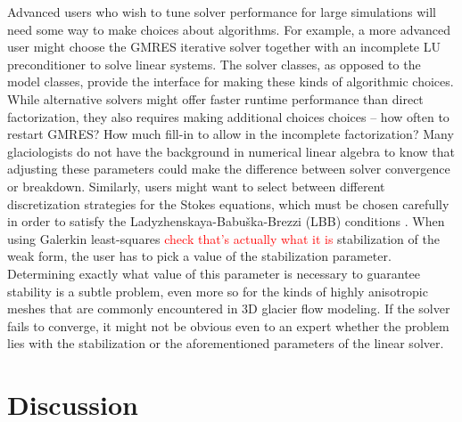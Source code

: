 \documentclass{article}
\theoremstyle{definition}
\theoremstyle{plain}
\begin{document}
Advanced users who wish to tune solver performance for large simulations will need some way to make choices about algorithms.
For example, a more advanced user might choose the GMRES iterative solver together with an incomplete LU preconditioner to solve linear systems.
The solver classes, as opposed to the model classes, provide the interface for making these kinds of algorithmic choices.
While alternative solvers might offer faster runtime performance than direct factorization, they also requires making additional choices choices -- how often to restart GMRES?
How much fill-in to allow in the incomplete factorization?
Many glaciologists do not have the background in numerical linear algebra to know that adjusting these parameters could make the difference between solver convergence or breakdown.
Similarly, users might want to select between different discretization strategies for the Stokes equations, which must be chosen carefully in order to satisfy the Ladyzhenskaya-Babu\v{s}ka-Brezzi (LBB) conditions \citep{boffi2013mixed}.
When using Galerkin least-squares \textcolor{red}{check that's actually what it is} stabilization of the weak form, the user has to pick a value of the stabilization parameter.
Determining exactly what value of this parameter is necessary to guarantee stability is a subtle problem, even more so for the kinds of highly anisotropic meshes that are commonly encountered in 3D glacier flow modeling.
If the solver fails to converge, it might not be obvious even to an expert whether the problem lies with the stabilization or the aforementioned parameters of the linear solver.


\section{Discussion}





\end{document}

